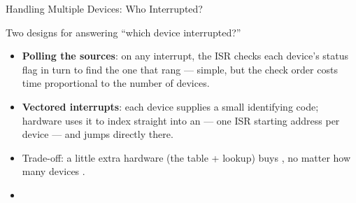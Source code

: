 \documentclass[aspectratio=169]{beamer}
\begin{document}
\begin{frame}{Handling Multiple Devices: Who Interrupted?}
  \begin{block}{Two designs for answering ``which device interrupted?''}
    \begin{itemize}
      \item \textbf{Polling the sources}: on any interrupt, the ISR checks each
        device's status flag in turn to find the one that rang --- simple, but
        the check order costs time proportional to the number of devices.
      \item \textbf{Vectored interrupts}: each device supplies a small
        identifying code; hardware uses it to index straight into an
         --- one ISR starting address per
        device --- and jumps directly there.
    \end{itemize}
  \end{block}
  \begin{itemize}
    \item Trade-off: a little extra hardware (the table + lookup) buys
      , no matter how many devices
      \cite{Hamacher2002_computer_organization}.
    \item {}
  \end{itemize}
\end{frame}
\end{document}
